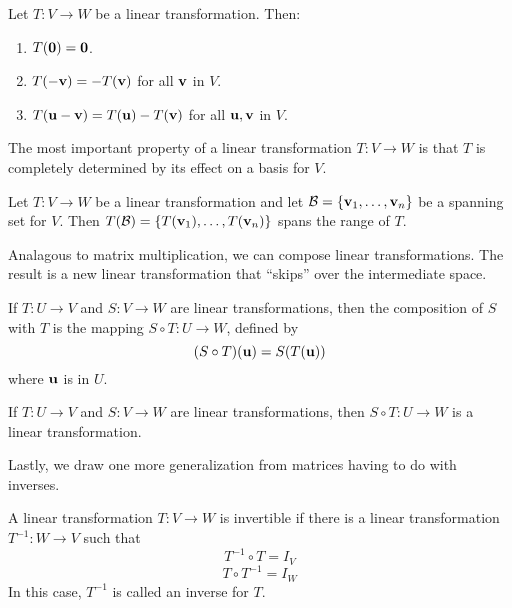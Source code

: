 \documentclass[../m73main.tex]{chapters}
\begin{document}
\begin{theorem}
	Let $T : V \to W$ be a linear transformation.
	Then:
	\begin{enumerate}[label=(\alph*)]
		\item $T(\mathbf{0}) = \mathbf{0}$.
		\item $T(-\mathbf{v}) = -T(\mathbf{v})$ for all $\mathbf{v}$ in $V$.
		\item $T(\mathbf{u} - \mathbf{v}) = T(\mathbf{u}) - T(\mathbf{v})$ for all $\mathbf{u}, \mathbf{v}$ in $V$.
	\end{enumerate}
\end{theorem}

The most important property of a linear transformation $T : V \to W$ is that $T$ is completely determined by its effect on a basis for $V$.

\begin{theorem}
	Let $T : V \to W$ be a linear transformation and let $\mathcal{B} = \{\mathbf{v}_1, \ldots, \mathbf{v}_n\}$ be a spanning set for $V$.
	Then $T(\mathcal{B}) = \{T(\mathbf{v}_1), \ldots, T(\mathbf{v}_n)\}$ spans the range of $T$.
\end{theorem}

Analagous to matrix multiplication, we can compose linear transformations.
The result is a new linear transformation that ``skips'' over the intermediate space.

\begin{definition}
	If $T : U \to V$ and $S : V \to W$ are linear transformations, then the composition of $S$ with $T$ is the mapping $S \circ T : U \to W$, defined by
	\[ (S \circ T)(\mathbf{u}) = S(T(\mathbf{u})) \]
	where $\mathbf{u}$ is in $U$.
\end{definition}

\begin{theorem}
	If $T : U \to V$ and $S : V \to W$ are linear transformations, then $S \circ T : U \to W$ is a linear transformation.
\end{theorem}

Lastly, we draw one more generalization from matrices having to do with inverses.

\begin{definition}
	A linear transformation $T : V \to W$ is invertible if there is a linear transformation $T^{-1} : W \to V$ such that
	\[ T^{-1} \circ T = I_V \]
	\[ T \circ T^{-1} = I_W \]
	In this case, $T^{-1}$ is called an inverse for $T$.
\end{definition}
\end{document}
